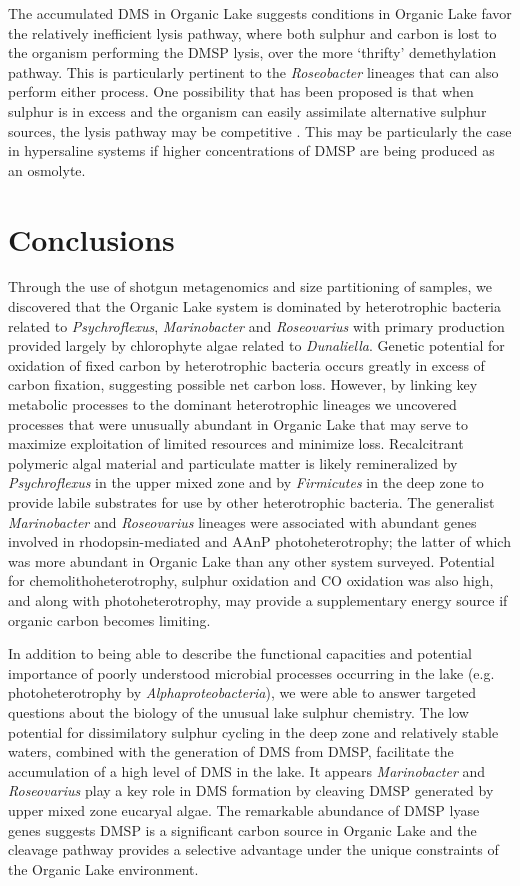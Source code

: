The accumulated \ac{DMS} in Organic Lake suggests conditions in Organic Lake favor the relatively inefficient lysis pathway, where both sulphur and carbon is lost to the organism performing the \ac{DMSP} lysis, over the more `thrifty' demethylation pathway. 
This is particularly pertinent to the \emph{Roseobacter} lineages that can also perform either process. 
One possibility that has been proposed is that when sulphur is in excess and the organism can easily assimilate alternative sulphur sources, the lysis pathway may be competitive \cite{Johnston2008}. 
This may be particularly the case in hypersaline systems if higher concentrations of \ac{DMSP} are being produced as an osmolyte.

\section{Conclusions}
Through the use of shotgun metagenomics and size partitioning of samples, we discovered that the Organic Lake system is dominated by heterotrophic bacteria related to \emph{Psychroflexus}, \emph{Marinobacter} and \emph{Roseovarius} with primary production provided largely by chlorophyte algae related to \emph{Dunaliella}. 
Genetic potential for oxidation of fixed carbon by heterotrophic bacteria occurs greatly in excess of carbon fixation, suggesting possible net carbon loss. 
However, by linking key metabolic processes to the dominant heterotrophic lineages we uncovered processes that were unusually abundant in Organic Lake that may serve to maximize exploitation of limited resources and minimize loss. 
Recalcitrant polymeric algal material and particulate matter is likely remineralized by \emph{Psychroflexus} in the upper mixed zone and by \emph{Firmicutes} in the deep zone to provide labile substrates for use by other heterotrophic bacteria. 
The generalist \emph{Marinobacter} and \emph{Roseovarius} lineages were associated with abundant genes involved in rhodopsin-mediated and \ac{AAnP} photoheterotrophy; the latter of which was more abundant in Organic Lake than any other system surveyed. 
Potential for chemolithoheterotrophy, sulphur oxidation and CO oxidation was also high, and along with photoheterotrophy, may provide a supplementary energy source if organic carbon becomes limiting.

In addition to being able to describe the functional capacities and potential importance of poorly understood microbial processes occurring in the lake (e.g. photoheterotrophy by \emph{Alphaproteobacteria}), we were able to answer targeted questions about the biology of the unusual lake sulphur chemistry. 
The low potential for dissimilatory sulphur cycling in the deep zone and relatively stable waters, combined with the generation of \ac{DMS} from \ac{DMSP}, facilitate the accumulation of a high level of \ac{DMS} in the lake. 
It appears \emph{Marinobacter} and \emph{Roseovarius} play a key role in \ac{DMS} formation by cleaving \ac{DMSP} generated by upper mixed zone eucaryal algae. 
The remarkable abundance of \ac{DMSP} lyase genes suggests \ac{DMSP} is a significant carbon source in Organic Lake and the cleavage pathway provides a selective advantage under the unique constraints of the Organic Lake environment.

